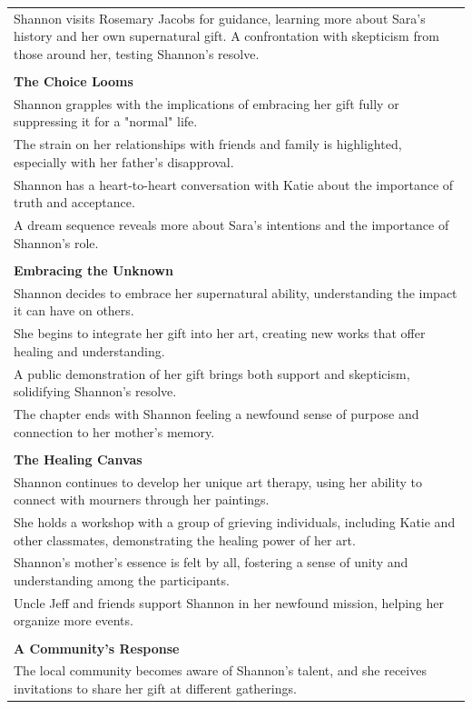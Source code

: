\begin{small}
\begin{longtable}{p{}}
Shannon visits Rosemary Jacobs for guidance, learning more about Sara's history and her own supernatural gift.
A confrontation with skepticism from those around her, testing Shannon's resolve.\\
\\
\textbf{The Choice Looms}\\
Shannon grapples with the implications of embracing her gift fully or suppressing it for a "normal" life.\\
The strain on her relationships with friends and family is highlighted, especially with her father's disapproval.\\
Shannon has a heart-to-heart conversation with Katie about the importance of truth and acceptance.\\
A dream sequence reveals more about Sara's intentions and the importance of Shannon's role.\\
\\
\textbf{Embracing the Unknown}\\
Shannon decides to embrace her supernatural ability, understanding the impact it can have on others.\\
She begins to integrate her gift into her art, creating new works that offer healing and understanding.\\
A public demonstration of her gift brings both support and skepticism, solidifying Shannon's resolve.\\
The chapter ends with Shannon feeling a newfound sense of purpose and connection to her mother's memory.\\
\\
\textbf{The Healing Canvas}\\
Shannon continues to develop her unique art therapy, using her ability to connect with mourners through her paintings.\\
She holds a workshop with a group of grieving individuals, including Katie and other classmates, demonstrating the healing power of her art.\\
Shannon's mother's essence is felt by all, fostering a sense of unity and understanding among the participants.\\
Uncle Jeff and friends support Shannon in her newfound mission, helping her organize more events.\\
\\
\textbf{A Community's Response}\\
The local community becomes aware of Shannon's talent, and she receives invitations to share her gift at different gatherings.\\

\end{longtable}
\end{small}
